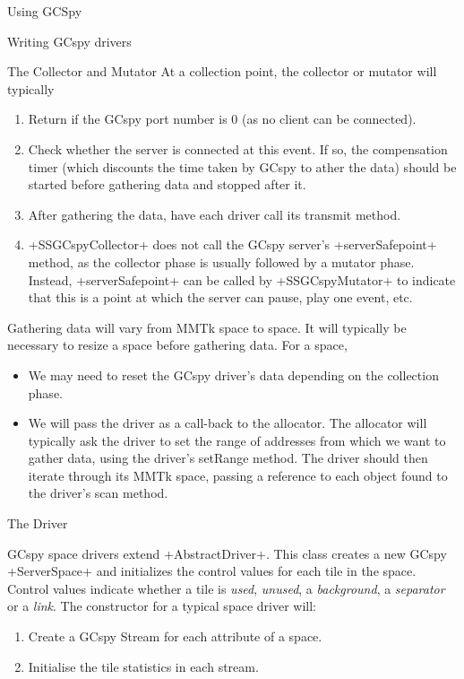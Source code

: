 \begin{section}{Using GCSpy}
\begin{subsection}{Writing GCspy drivers}
\begin{subsubsection}{The Collector and Mutator}
At a collection point, the collector or mutator will typically
\begin{enumerate}
  \item Return if the GCspy port number is 0 (as no client can be connected).
  \item Check whether the server is connected at this event. If so, the compensation timer (which discounts the time taken by GCspy to ather the data) should be started before gathering data and stopped after it.
  \item  After gathering the data, have each driver call its transmit method.
  \item \spverb+SSGCspyCollector+ does not call the GCspy server's \spverb+serverSafepoint+ method, as the collector phase is usually followed by a mutator phase. Instead, \spverb+serverSafepoint+ can be called by \spverb+SSGCspyMutator+ to indicate that this is a point at which the server can pause, play one event, etc.
\end{enumerate}

Gathering data will vary from MMTk space to space. It will typically be necessary to resize a space before gathering data. For a space,
\begin{itemize}
  \item We may need to reset the GCspy driver's data depending on the collection phase.
  \item  We will pass the driver as a call-back to the allocator. The allocator will typically ask the driver to set the range of addresses from which we want to gather data, using the driver's setRange method. The driver should then iterate through its MMTk space, passing a reference to each object found to the driver's scan method.
\end{itemize}

\end{subsubsection}

\begin{subsubsection}{The Driver}

GCspy space drivers extend \spverb+AbstractDriver+. This class creates a new GCspy \spverb+ServerSpace+ and initializes the control values for each tile in the space. Control values indicate whether a tile is \textit{used}, \textit{unused}, a \textit{background}, a \textit{separator} or a \textit{link}. The constructor for a typical space driver will:
\begin{enumerate}
  \item Create a GCspy Stream for each attribute of a space.
  \item Initialise the tile statistics in each stream.
\end{enumerate}


\end{subsubsection}
\end{subsection}
\end{section}
